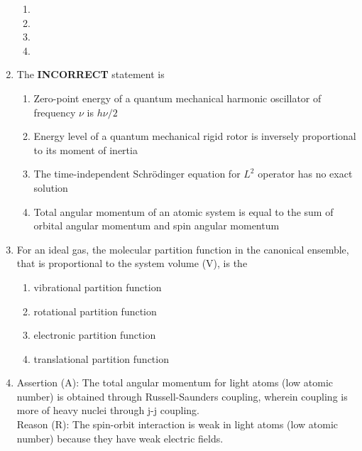 \documentclass[journal,12pt,onecolumn]{IEEEtran}
\theoremstyle{remark}
\begin{document}
\begin{enumerate}
\begin{multicols}{2}
\begin{enumerate}
\item {}
\item {}
\item {}
\item {}
\end{enumerate}
\end{multicols}

\item The \textbf{INCORRECT} statement is \hfill{}

\begin{multicols}{1}
\begin{enumerate}
\item Zero-point energy of a quantum mechanical harmonic oscillator of frequency \(\nu\) is \(h\nu/2\)
\item Energy level of a quantum mechanical rigid rotor is inversely proportional to its moment of inertia
\item The time-independent Schrödinger equation for \(L^2\) operator has no exact solution
\item Total angular momentum of an atomic system is equal to the sum of orbital angular momentum and spin angular momentum
\end{enumerate}
\end{multicols}

\item For an ideal gas, the molecular partition function in the canonical ensemble, that is proportional to the system volume (V), is the \hfill{}

\begin{multicols}{2}
\begin{enumerate}
\item vibrational partition function
\item rotational partition function
\item electronic partition function
\item translational partition function
\end{enumerate}
\end{multicols}

\item Assertion (A): The total angular momentum for light atoms (low atomic number) is obtained through Russell-Saunders coupling, wherein coupling is more of heavy nuclei through j-j coupling.\\
Reason (R): The spin-orbit interaction is weak in light atoms (low atomic number) because they have weak electric fields. \hfill{}


\end{enumerate}
\end{document}
